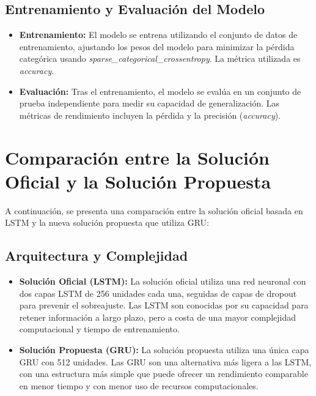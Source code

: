 \documentclass[runningheads]{llncs}
\begin{document}
\subsection{Entrenamiento y Evaluación del Modelo}

\begin{itemize}
    \item \textbf{Entrenamiento:} El modelo se entrena utilizando el conjunto de datos de entrenamiento, ajustando los pesos del modelo para minimizar la pérdida categórica usando \textit{sparse\_categorical\_crossentropy}. La métrica utilizada es \textit{accuracy}.
    \item \textbf{Evaluación:} Tras el entrenamiento, el modelo se evalúa en un conjunto de prueba independiente para medir su capacidad de generalización. Las métricas de rendimiento incluyen la pérdida y la precisión (\textit{accuracy}).
\end{itemize}

\section{Comparación entre la Solución Oficial y la Solución Propuesta}

A continuación, se presenta una comparación entre la solución oficial basada en LSTM y la nueva solución propuesta que utiliza GRU:

\subsection{Arquitectura y Complejidad}

\begin{itemize}
    \item \textbf{Solución Oficial (LSTM):} La solución oficial utiliza una red neuronal con dos capas LSTM de 256 unidades cada una, seguidas de capas de dropout para prevenir el sobreajuste. Las LSTM son conocidas por su capacidad para retener información a largo plazo, pero a costa de una mayor complejidad computacional y tiempo de entrenamiento.
    
    \item \textbf{Solución Propuesta (GRU):} La solución propuesta utiliza una única capa GRU con 512 unidades. Las GRU son una alternativa más ligera a las LSTM, con una estructura más simple que puede ofrecer un rendimiento comparable en menor tiempo y con menor uso de recursos computacionales.
\end{itemize}
\end{document}
